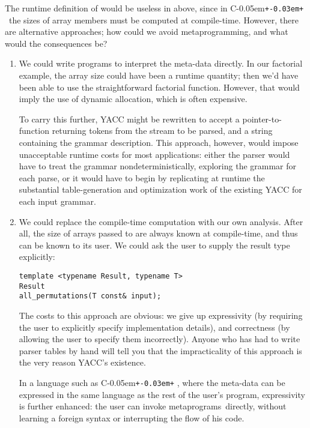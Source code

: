 \documentclass{netobjectdays}
\newcommand{\Cpp}{C\kern-0.05em\texttt{+\kern-0.03em+}%
}
\newcommand{\mping}{meta\-program\-ming}
\newcommand{\mpgms}{meta\-programs}
\begin{document}
The runtime definition of  would be useless in
 above, since in \Cpp\ the sizes of array
members must be computed at compile-time. However, there are
alternative approaches; how could we avoid \mping, and what would the
consequences be?

\begin{enumerate}

\item We could write programs to interpret the meta-data directly. In
  our factorial example, the array size could have been a runtime
  quantity; then we'd have been able to use the straightforward
  factorial function. However, that would imply the use of dynamic
  allocation, which is often expensive.

  To carry this further, YACC might be rewritten to accept a
  pointer-to-function returning tokens from the stream to be parsed,
  and a string containing the grammar description. This approach,
  however, would impose unacceptable runtime costs for most
  applications: either the parser would have to treat the grammar
  nondeterministically, exploring the grammar for each parse, or it
  would have to begin by replicating at runtime the substantial
  table-generation and optimization work of the existing YACC for each
  input grammar.

\item We could replace the compile-time computation with our own
  analysis. After all, the size of arrays passed to
   are always known at compile-time, and
  thus can be known to its user. We could ask the user to supply the
  result type explicitly: {\footnotesize
  \begin{verbatim}
template <typename Result, typename T>
Result
all_permutations(T const& input);
  \end{verbatim}
  }
  The costs to this approach are obvious: we give up expressivity (by
  requiring the user to explicitly specify implementation details),
  and correctness (by allowing the user to specify them
  incorrectly). Anyone who has had to write parser tables by hand will
  tell you that the impracticality of this approach is the very reason
  YACC's existence.

  In a language such as \Cpp, where the meta-data can be expressed in
  the same language as the rest of the user's program, expressivity is
  further enhanced: the user can invoke \mpgms\ directly, without
  learning a foreign syntax or interrupting the flow of his code.
\end{enumerate}
\end{document}
